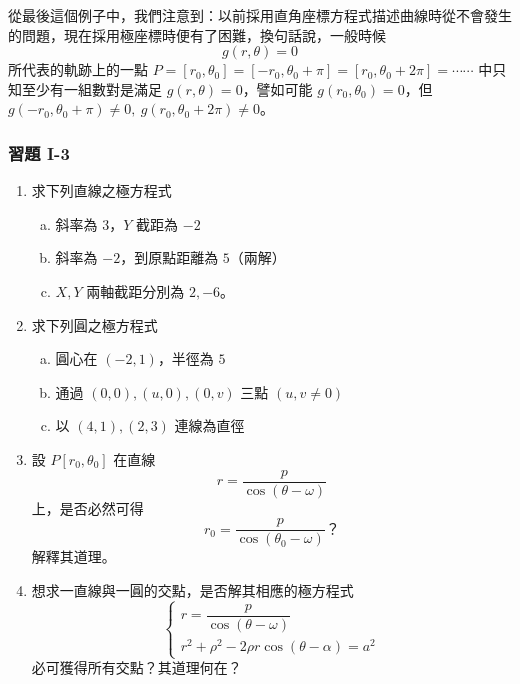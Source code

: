 從最後這個例子中，我們注意到：以前採用直角座標方程式描述曲線時從不會發生的問題，現在採用極座標時便有了困難，換句話說，一般時候
\[
  g(r, \theta) = 0
\]
所代表的軌跡上的一點 $P = [r_0, \theta_0] = [-r_0, \theta_0 + \pi] = [r_0, \theta_0 + 2\pi] = \cdots\cdots$ 中只知至少有一組數對是滿足 $g(r, \theta) = 0$，譬如可能 $g(r_0, \theta_0) = 0$，但 $g(-r_0, \theta_0 + \pi) \neq 0, \ g(r_0, \theta_0 + 2\pi) \neq 0$。

\subsubsection*{習題 I-3}\label{sec:b5-ex1-3}

\begin{enumerate}[1.]
  \item 求下列直線之極方程式
  \begin{enumerate}[(a)]
    \item 斜率為 $3$，$Y$ 截距為 $-2$
    \item 斜率為 $-2$，到原點距離為 $5$（兩解）
    \item $X, Y$ 兩軸截距分別為 $2, -6$。
  \end{enumerate}

  \item 求下列圓之極方程式
  \begin{enumerate}[(a)]
    \item 圓心在 $(-2, 1)$，半徑為 $5$
    \item 通過 $(0, 0), (u, 0), (0, v)$ 三點 $(u, v \neq 0)$
    \item 以 $(4, 1), (2, 3)$ 連線為直徑
  \end{enumerate}

  \item 設 $P[r_0, \theta_0]$ 在直線
  \[
    r = \frac{p}{\cos(\theta - \omega)}
  \]
  上，是否必然可得
  \[
    r_0 = \frac{p}{\cos(\theta_0 - \omega)}\text{？}
  \]
  解釋其道理。

  \item 想求一直線與一圓的交點，是否解其相應的極方程式
  \[
    \begin{cases}
      r = \dfrac{p}{\cos(\theta - \omega)} \\[8pt]
      r^2 + \rho^2 - 2\rho r\cos(\theta - \alpha) = a^2
    \end{cases}
  \]
  必可獲得所有交點？其道理何在？


\end{enumerate}
